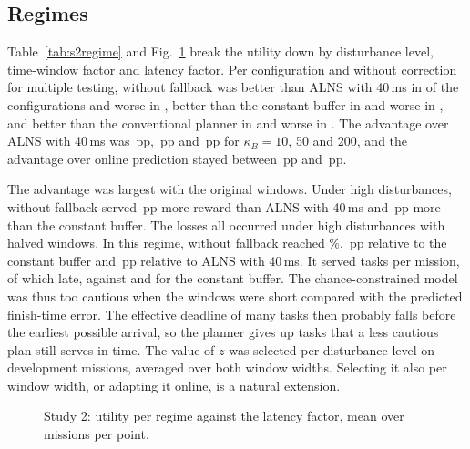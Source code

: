 \subsection{Regimes}\label{sec:s2-regime}
Table~\ref{tab:s2regime} and Fig.~\ref{fig:s2regime} break the utility down by disturbance level, time-window factor and
latency factor. Per configuration and without correction for multiple testing, \mname{} without fallback was better than
ALNS with 40\,ms in  of the  configurations and worse in , better than the
constant buffer in  and worse in , and better than the conventional planner in 
and worse in . The advantage over ALNS with 40\,ms was \,pp, \,pp and
\,pp for $\kappa_B=10$, 50 and 200, and the advantage over online prediction stayed between
\,pp and \,pp.

The advantage was largest with the original windows. Under high disturbances, \mname{} without fallback served
\,pp more reward than ALNS with 40\,ms and \,pp more than the constant buffer.
The losses all occurred under high disturbances with halved windows. In this regime, \mname{} without fallback reached
\%, \,pp relative to the constant buffer and \,pp relative
to ALNS with 40\,ms. It served  tasks per mission, of which  late,
against  and  for the constant buffer. The chance-constrained model was
thus too cautious when the windows were short compared with the predicted finish-time error. The effective deadline of
many tasks then probably falls before the earliest possible arrival, so the planner gives up tasks that a less cautious
plan still serves in time. The value of $z$ was selected per disturbance level on development missions, averaged over
both window widths. Selecting it also per window width, or adapting it online, is a natural extension.


\begin{figure}[t]
\centering
{}
\caption{Study 2: utility per regime against the latency factor, mean over  missions per point.}\label{fig:s2regime}
\end{figure}

